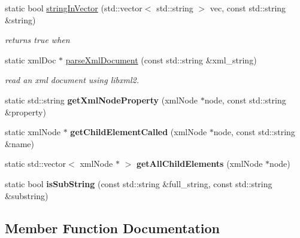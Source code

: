 \begin{DoxyCompactItemize}
static bool \hyperlink{classomexmeta_1_1OmexMetaUtils_a6f8e406b8798bd2f1f0ae0d1bd07ed2b}{string\+In\+Vector} (std\+::vector$<$ std\+::string $>$ vec, const std\+::string \&string)
\begin{DoxyCompactList}\small\item\em returns true when \end{DoxyCompactList}\item 
static xml\+Doc $\ast$ \hyperlink{classomexmeta_1_1OmexMetaUtils_a718710d8ba7fc7598bd73a5456b3d903}{parse\+Xml\+Document} (const std\+::string \&xml\+\_\+string)
\begin{DoxyCompactList}\small\item\em read an xml document using libxml2. \end{DoxyCompactList}\item 
\mbox{\label{classomexmeta_1_1OmexMetaUtils_a29cc8222c809162eadbc424a0687cbf3}} 
static std\+::string {\bfseries get\+Xml\+Node\+Property} (xml\+Node $\ast$node, const std\+::string \&property)
\item 
\mbox{\label{classomexmeta_1_1OmexMetaUtils_a1dbcd874b2b72531e7f4f9e82524d8e8}} 
static xml\+Node $\ast$ {\bfseries get\+Child\+Element\+Called} (xml\+Node $\ast$node, const std\+::string \&name)
\item 
\mbox{\label{classomexmeta_1_1OmexMetaUtils_a4d6f7d2140c42435be9339edf975b949}} 
static std\+::vector$<$ xml\+Node $\ast$ $>$ {\bfseries get\+All\+Child\+Elements} (xml\+Node $\ast$node)
\item 
\mbox{\label{classomexmeta_1_1OmexMetaUtils_a96e93667c8799b9569cb30fc102b129b}} 
static bool {\bfseries is\+Sub\+String} (const std\+::string \&full\+\_\+string, const std\+::string \&substring)
\end{DoxyCompactItemize}


\subsection{Member Function Documentation}
\mbox{\label{classomexmeta_1_1OmexMetaUtils_ae645af49ce57dac8bd0e0eba9e39a6c0}} 
